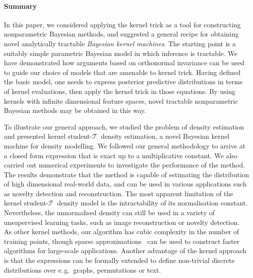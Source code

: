 \documentclass[twoside]{article}
\newcommand{\studentt}{student-$\mathcal{T}$\ }
\newcommand{\eg}{e.\,g.\ }
\begin{document}
\paragraph{Summary} In this paper, we considered applying the kernel trick as a tool for constructing nonparametric Bayesian methods, and suggested a general recipe for obtaining novel analytically tractable \emph{Bayesian kernel machines}. The starting point is a suitably simple parametric Bayesian model in which inference is tractable. We have demonstrated how arguments based on orthonormal invariance can be used to guide our choice of models that are amenable to kernel trick. Having defined the basic model, one needs to express posterior predictive distributions in terms of kernel evaluations, then apply the kernel trick in those equations. By using kernels with infinite dimensional feature spaces, novel tractable nonparametric Bayesian methods may be obtained in this way.

To illustrate our general approach, we studied the problem of density estimation and presented kernel \studentt density estimation, a novel Bayesian kernel machine for density modelling. We followed our general methodology to arrive at a closed form expression that is exact up to a multiplicative constant. We also carried out numerical experiments to investigate the performance of the method. The results demonstrate that the method is capable of estimating the distribution of high dimensional real-world data, and can be used in various applications such as novelty detection and reconstruction. The most apparent limitation of the kernel \studentt density model is the intractability of its normalisation constant. Nevertheless, the unnormalised density can still be used in a variety of unsupervised learning tasks, such as image reconstruction or novelty detection. As other kernel methods, our algorithm has cubic complexity in the number of training points, though sparse approximations~\cite{Fine2001} can be used to construct faster algorithms for large-scale applications. Another advantage of the kernel approach is that the expressions can be formally extended to define non-trivial discrete distributions over \eg graphs, permutations or text.
\end{document}
